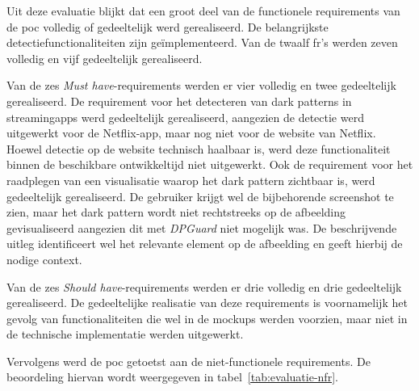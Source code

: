 \vspace{1em}

Uit deze evaluatie blijkt dat een groot deel van de functionele requirements van de \acrshort{poc} volledig of gedeeltelijk werd gerealiseerd. De belangrijkste detectiefunctionaliteiten zijn geïmplementeerd. Van de twaalf \acrshort{fr}'s werden zeven volledig en vijf gedeeltelijk gerealiseerd.

\vspace{1em}

Van de zes \textit{Must have}-requirements werden er vier volledig en twee gedeeltelijk gerealiseerd. De requirement voor het detecteren van dark patterns in streamingapps werd gedeeltelijk gerealiseerd, aangezien de detectie werd uitgewerkt voor de Netflix-app, maar nog niet voor de website van Netflix. Hoewel detectie op de website technisch haalbaar is, werd deze functionaliteit binnen de beschikbare ontwikkeltijd niet uitgewerkt. Ook de requirement voor het raadplegen van een visualisatie waarop het dark pattern zichtbaar is, werd gedeeltelijk gerealiseerd. De gebruiker krijgt wel de bijbehorende screenshot te zien, maar het dark pattern wordt niet rechtstreeks op de afbeelding gevisualiseerd aangezien dit met \textit{DPGuard} niet mogelijk was. De beschrijvende uitleg identificeert wel het relevante element op de afbeelding en geeft hierbij de nodige context.

\vspace{1em} 

Van de zes \textit{Should have}-requirements werden er drie volledig en drie gedeeltelijk gerealiseerd. De gedeeltelijke realisatie van deze requirements is voornamelijk het gevolg van functionaliteiten die wel in de mockups werden voorzien, maar niet in de technische implementatie werden uitgewerkt.

\vspace{1em}

Vervolgens werd de \acrshort{poc} getoetst aan de niet-functionele requirements. De beoordeling hiervan wordt weergegeven in tabel~\ref{tab:evaluatie-nfr}.

\vspace{1em}


